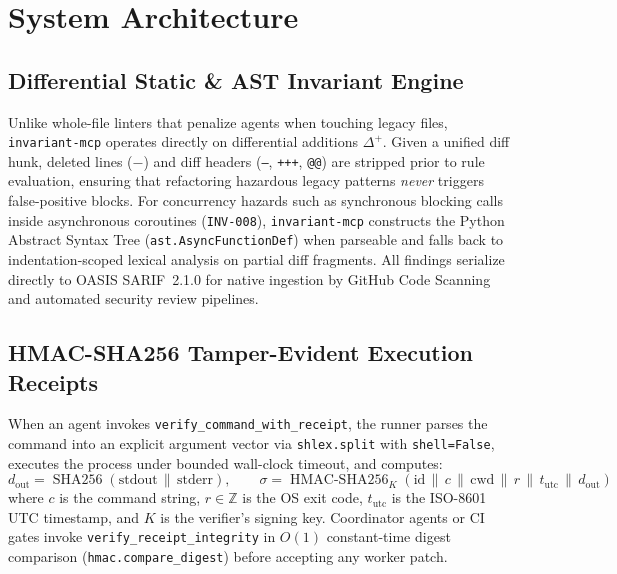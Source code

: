 \documentclass[11pt,a4paper]{article}
\begin{document}
\section{System Architecture}

\subsection{Differential Static \& AST Invariant Engine}
Unlike whole-file linters that penalize agents when touching legacy files, \texttt{invariant-mcp} operates directly on differential additions $\Delta^{+}$. Given a unified diff hunk, deleted lines ($-$) and diff headers (\texttt{---}, \texttt{+++}, \texttt{@@}) are stripped prior to rule evaluation, ensuring that refactoring hazardous legacy patterns \emph{never} triggers false-positive blocks. For concurrency hazards such as synchronous blocking calls inside asynchronous coroutines (\texttt{INV-008}), \texttt{invariant-mcp} constructs the Python Abstract Syntax Tree (\texttt{ast.AsyncFunctionDef}) when parseable and falls back to indentation-scoped lexical analysis on partial diff fragments. All findings serialize directly to OASIS SARIF~2.1.0 for native ingestion by GitHub Code Scanning and automated security review pipelines.

\subsection{HMAC-SHA256 Tamper-Evident Execution Receipts}
When an agent invokes \texttt{verify\_command\_with\_receipt}, the runner parses the command into an explicit argument vector via \texttt{shlex.split} with \texttt{shell=False}, executes the process under bounded wall-clock timeout, and computes:
\[
d_{\text{out}} = \operatorname{SHA256}(\text{stdout} \,\|\, \text{stderr}), \qquad
\sigma = \operatorname{HMAC-SHA256}_{K}\!\left(\text{id} \,\|\, c \,\|\, \text{cwd} \,\|\, r \,\|\, t_{\text{utc}} \,\|\, d_{\text{out}}\right)
\]
where $c$ is the command string, $r \in \mathbb{Z}$ is the OS exit code, $t_{\text{utc}}$ is the ISO-8601 UTC timestamp, and $K$ is the verifier's signing key. Coordinator agents or CI gates invoke \texttt{verify\_receipt\_integrity} in $O(1)$ constant-time digest comparison (\texttt{hmac.compare\_digest}) before accepting any worker patch.
\end{document}
